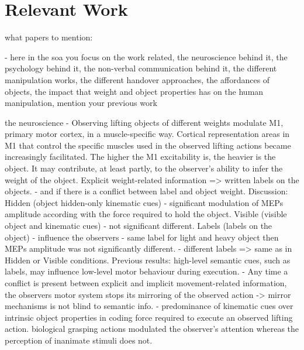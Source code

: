\section{Relevant Work}

what papers to mention:

- here in the soa you focus on the work related, the neuroscience behind it, the psychology behind it, the non-verbal communication behind it, the different manipulation works, the different handover approaches, the affordances of objects, the impact that weight and object properties has on the human manipulation, mention your previous work

the neuroscience - 
\cite{alaerts_force_2010} Observing lifting objects of different weights modulate M1, primary motor cortex, in a muscle-specific way. Cortical representation areas in M1 that control the specific muscles used in the observed lifting actions became increasingly facilitated. The higher the M1 excitability is, the heavier is the object. It may contribute, at least partly, to the observer's ability to infer the weight of the object. 
 \cite{senot_effect_2011}
Explicit weight-related information => written labels on the objects. - and if there is a conflict between label and object weight. 
Discussion: Hidden (object hidden-only kinematic cues) - significant modulation of MEPs amplitude according with the force required to hold the object. Visible (visible object and kinematic cues) - not significant different. Labels (labels on the object) - influence the observers - same label for light and heavy object then MEPs amplitude was not significantly different. - different labels => same as in Hidden or Visible conditions. 
Previous results: high-level semantic cues, such as labels, may influence low-level motor behaviour during execution. - Any time a conflict is present between explicit and implicit movement-related information, the observers motor system stops its mirroring of the observed action -> mirror mechanisms is not blind to semantic info. - predominance of kinematic cues over intrinsic object properties in coding force required to execute an observed lifting action. 
\cite{lindemann_grasping_2011} biological grasping actions modulated the observer's attention whereas the perception of inanimate stimuli does not.

